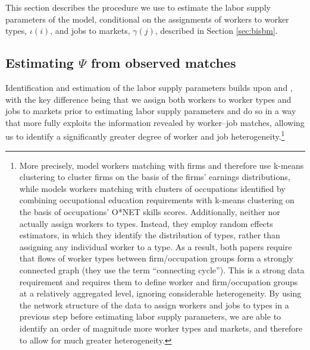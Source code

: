 \documentclass[12pt]{article}
\def\g{\gamma}
\def\i{\iota}
\theoremstyle{definition}
\theoremstyle{plain}
\begin{document}
This section describes the procedure we use to estimate the labor supply parameters of the model, conditional on the assignments of workers to worker types, $\i(i)$, and jobs to markets, $\g(j)$, described in Section \ref{sec:bisbm}.


\subsection{Estimating $\Psi$ from observed matches}

\label{sec:estimating_psi}


Identification and estimation of the labor supply parameters builds upon  \citet{BonhommeLamadonManresa2019_distributional} and \citet{Grigsby2022}, with the key difference being that we assign both workers to worker types and jobs to markets prior to estimating labor supply parameters and do so in a way that more fully exploits the information revealed by worker--job matches, allowing us to identify a significantly greater degree of worker and job heterogeneity.\footnote{More precisely, \citet{BonhommeLamadonManresa2019_distributional} model workers matching with firms and therefore use k-means clustering to cluster firms on the basis of the firms' earnings distributions, while \citet{Grigsby2022} models workers matching with clusters of occupations identified by combining occupational education requirements with k-means clustering on the basis of occupations' O*NET skills scores. Additionally, neither \citet{BonhommeLamadonManresa2019_distributional} nor \citet{Grigsby2022} actually assign workers to types. Instead,  they employ random effects estimators, in which they identify the distribution of types, rather than assigning any individual worker to a type. As a result, both papers require that flows of worker types between firm/occupation groups form a strongly connected graph (they use the term ``connecting cycle''). This is a strong data requirement and requires them to define worker and firm/occupation groups at a relatively aggregated level, ignoring considerable heterogeneity. By using the network structure of the data to assign workers and jobs to types in a previous step before estimating labor supply parameters, we are able to identify an order of magnitude more worker types and markets, and therefore to allow for much greater heterogeneity.} 
\end{document}

